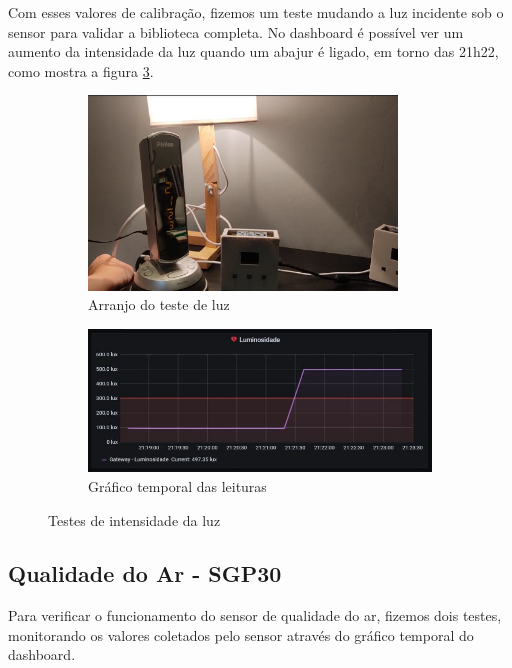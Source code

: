 \documentclass[../monografia.tex]{subfiles}
\begin{document}
Com esses valores de calibração, fizemos um teste mudando a luz incidente sob o sensor para validar a biblioteca completa. No dashboard é possível ver um aumento da intensidade da luz quando um abajur é ligado, em torno das 21h22, como mostra a figura \ref{fig:teste-luz}. 

\begin{figure}[h]
\centering
	\begin{subfigure}{0.5\textwidth}
		\centering
		\includegraphics[width=0.9\textwidth]{teste-luz.png}
		\caption{Arranjo do teste de luz}
		\label{fig:arranjo-luz}
	\end{subfigure}%
	\begin{subfigure}{0.5\textwidth}
		\centering
		\includegraphics[width=\textwidth]{dashboard-luz}
		\caption{Gráfico temporal das leituras}
		\label{fig:dash-luz}
	\end{subfigure}
	\caption{Testes de intensidade da luz}
	\label{fig:teste-luz}
\end{figure}
\newpage

\subsection{Qualidade do Ar - SGP30}

Para verificar o funcionamento do sensor de qualidade do ar, fizemos dois testes, monitorando os valores coletados pelo sensor através do gráfico temporal do dashboard. 
\end{document}
